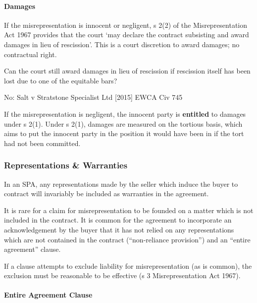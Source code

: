 \documentclass[
]{article}
\newenvironment{env-b56569b0-a3e1-47fe-b37c-6cf3ba4ee6a2}
{
    \savenotes\tcolorbox[blanker,breakable,left=5pt,borderline west={2pt}{-4pt}{gray}]
}
{
    \endtcolorbox\spewnotes
}
\begin{document}
\hypertarget{damages}{%
\paragraph{Damages}\label{damages}}

If the misrepresentation is innocent or negligent, s 2(2) of the
Misrepresentation Act 1967 provides that the court `may declare the
contract subsisting and award damages in lieu of rescission'. This is a
court discretion to award damages; no contractual right.

\begin{env-b56569b0-a3e1-47fe-b37c-6cf3ba4ee6a2}

Can the court still award damages in lieu of rescission if rescission
itself has been lost due to one of the equitable bars?

No: Salt v Stratstone Specialist Ltd {[}2015{]} EWCA Civ 745

\end{env-b56569b0-a3e1-47fe-b37c-6cf3ba4ee6a2}

If the misrepresentation is negligent, the innocent party is
\textbf{entitled} to damages under s 2(1). Under s 2(1), damages are
measured on the tortious basis, which aims to put the innocent party in
the position it would have been in if the tort had not been committed.

\hypertarget{representations-warranties}{%
\subsubsection{Representations \&
Warranties}\label{representations-warranties}}

In an SPA, any representations made by the seller which induce the buyer
to contract will invariably be included as warranties in the agreement.

It is rare for a claim for misrepresentation to be founded on a matter
which is not included in the contract. It is common for the agreement to
incorporate an acknowledgement by the buyer that it has not relied on
any representations which are not contained in the contract
(``non-reliance provision'') and an ``entire agreement'' clause.

If a clause attempts to exclude liability for misrepresentation (as is
common), the exclusion must be reasonable to be effective (s 3
Misrepresentation Act 1967).

\hypertarget{entire-agreement-clause}{%
\paragraph{Entire Agreement Clause}\label{entire-agreement-clause}}
\end{document}
